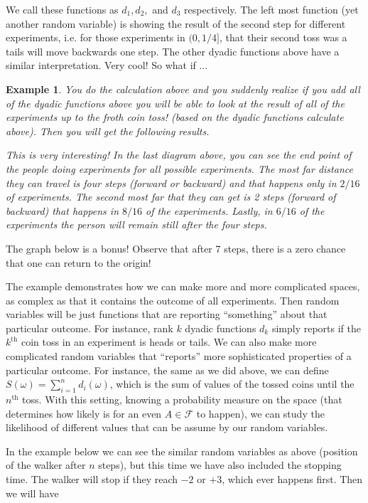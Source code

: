 \documentclass[11pt,a4paper]{article}
\theoremstyle{Example}
\newtheorem{example}{Example}
\begin{document}
 	We call these functions as $ d_1,d_2, $ and $ d_3 $ respectively. The left most function (yet another random variable) is showing the result of the second step for different experiments, i.e. for those experiments in $ (0,1/4] $, that their second toss was a tails will move backwards one step. The other dyadic functions above have a similar interpretation. Very cool! So what if ... 
 	
 	\begin{example}
 		You do the calculation above and you suddenly realize if you add all of the dyadic functions above you will be able to look at the result of all of the experiments up to the froth coin toss! (based on the dyadic functions calculate above). Then you will get the following results.
 		
 		\FloatBarrier
 		\noindent This is very interesting! In the last diagram above, you can see the end point of the people doing experiments for all possible experiments. The most far distance they can travel is four steps (forward or backward) and that happens only in $ 2/16 $ of experiments. The second most far that they can get is 2 steps (forward of backward) that happens in $ 8/16 $ of the experiments. Lastly, in $ 6/16 $ of the experiments the person will remain still after the four steps.
 	\end{example}
 	The graph below is a bonus! Observe that after 7 steps, there is a zero chance that one can return to the origin!
 	
 	\FloatBarrier
 	
 	
 	The example demonstrates how we can make more and more complicated spaces, as complex as that it contains the outcome of all experiments. Then random variables will be just functions that are reporting ``something'' about that particular outcome. For instance, rank $ k $ dyadic functions $ d_k $ simply reports if the $ k^\text{th} $ coin toss in an experiment is heads or tails. We can also make more complicated random variables that ``reports'' more sophisticated properties of a particular outcome. For instance, the same as we did above, we can define $ S(\omega) = \sum_{i=1}^n d_i(\omega) $, which is the sum of values of the tossed coins until the $ n^\text{th} $ toss. With this setting, knowing a probability measure on the space (that determines how likely is for an even $ A \in \mathcal{F} $ to happen), we can study the likelihood of different values that can be assume by our random variables.  
 	
 	In the example below we can see the similar random variables as above (position of the walker after $ n $ steps), but this time we have also included the stopping time. The walker will stop if they reach $ -2 $ or $ +3 $, which ever happens first. Then we will have
 	
 	
\end{document}
